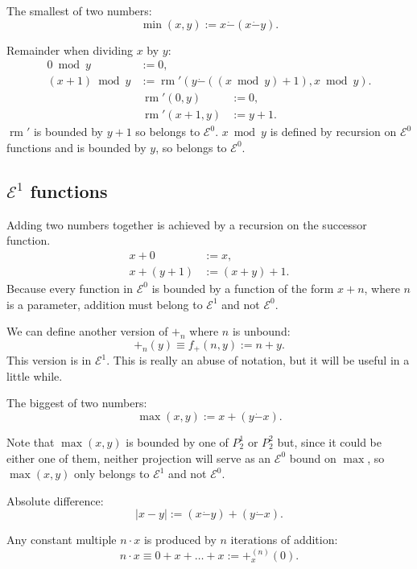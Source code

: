 \documentclass[a4paper]{article}
\newcommand{\grz}[1]{$\mathcal{E}^{#1}$}	%
\newcommand{\psub}{\dot -}	%
\newcommand{\recur}[1]{\begin{equation} \begin{split} #1 \end{split} \end{equation}}	%
\newcommand{\recurN}[1]{\begin{equation*} \begin{split} #1 \end{split} \end{equation*}}	%
\theoremstyle{plain}
\theoremstyle{definition}
\begin{document}
The smallest of two numbers:
\begin{equation} \min(x,y) := x \psub ( x \psub y). \end{equation}

Remainder when dividing $x$ by $y$:
\recur{
	0 \bmod{y} &:= 0,	\\
	(x+1) \bmod{y} &:= \operatorname{rm}' \left( y \psub \left( (x \bmod{y}) + 1 \right), x \bmod{y} \right).
	}
\recurN{
	\operatorname{rm}'(0,y) &:= 0, 	\\
	\operatorname{rm}'(x+1,y) &:= y+1.
}
$\operatorname{rm}'$ is bounded by $y+1$ so belongs to \grz{0}. $x \bmod{y}$ is defined by recursion on \grz{0} functions and is bounded by $y$, so belongs to \grz{0}.

\subsection{\grz{1} functions}
Adding two numbers together is achieved by a recursion on the successor function.
\recur{
	x + 0 &:= x,			\\
	x + (y+1) &:= (x+y) + 1.
}
Because every function in \grz{0} is bounded by a function of the form $x+n$, where $n$ is a parameter, addition must belong to \grz{1} and not \grz{0}.

We can define another version of $+_n$ where $n$ is unbound:
\begin{equation} +_n(y) \equiv f_{+}(n,y) := n + y. \end{equation}
This version is in \grz{1}. This is really an abuse of notation, but it will be useful in a little while.

The biggest of two numbers:
\begin{equation} \max(x,y) := x + (y \psub x). \end{equation}

Note that $\max(x,y)$ is bounded by one of $P_2^1$ or $P_2^2$ but, since it could be either one of them, neither projection will serve as an \grz{0} bound on $\max$, so $\max(x,y)$ only belongs to \grz{1} and not \grz{0}.

Absolute difference:
\begin{equation} |x - y| := (x \psub y) + (y \psub x). \end{equation}

Any constant multiple $n \cdot x$ is produced by $n$ iterations of addition:
\begin{equation} n \cdot x  \equiv 0 + x + \dots + x := +_x^{(n)}(0). \end{equation}
\end{document}
